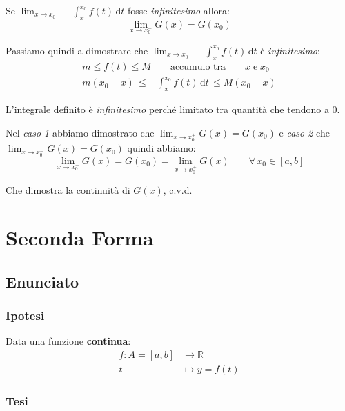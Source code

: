 \documentclass[../../analisi1]{subfiles}
\begin{document}
                    Se \( \lim_{x \to x_0^-} - \int_x^{x_0} \! f(t) \, \mathrm{d}t \) fosse \emph{infinitesimo} allora:
                    \[  \lim_{x \to x_0^-}G(x) = G(x_0) \]

                    Passiamo quindi a dimostrare che \( \lim_{x \to x_0^-} - \int_x^{x_0} \! f(t) \, \mathrm{d}t \) è \emph{infinitesimo}:
                    \begin{gather*}
                        m \leqslant f(t) \leqslant M \qquad \text {accumulo tra} \qquad x \; \text{e} \; x_0\\
                        m(x_0-x) \, \leqslant - \int_x^{x_0} \! f(t) \, \mathrm{d}t \, \leqslant M(x_0-x)
                    \end{gather*}

                    L'integrale definito è \emph{infinitesimo} perché limitato tra quantità che tendono a 0.

                    Nel \emph{caso 1} abbiamo dimostrato che \(  \lim_{x \to x_0^+}G(x) = G(x_0) \) e \emph{caso 2} che \(  \lim_{x \to x_0^-}G(x) = G(x_0) \) quindi abbiamo:
                    \[  \lim_{x \to x_0^-}G(x) = G(x_0) = \lim_{x \to x_0^+}G(x) \qquad \forall \, x_0 \in [a, b] \]

                    Che dimostra la continuità di \(G(x)\), c.v.d.
            
            \section*{Seconda Forma}

                \subsection*{Enunciato}

                    \subsubsection*{Ipotesi}

                        Data una funzione \textbf{continua}:
                        \begin{align*}
                            f : A = [a, b] &\longrightarrow \mathbb{R}\\
                            t &\longmapsto y = f(t) 
                        \end{align*}

                    \subsubsection*{Tesi}
                    
\end{document}
